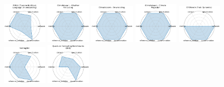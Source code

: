 
\begin{figure}[ht!]
\centering
\includegraphics[width=0.1900\textwidth]{images/mmlu_massive_multitask_language_understanding_radar.pdf}
\includegraphics[width=0.1900\textwidth]{images/climatelearn_-_weather_forcasting_radar.pdf}
\includegraphics[width=0.1900\textwidth]{images/climatelearn_-_downscaling_radar.pdf}
\includegraphics[width=0.1900\textwidth]{images/climatelearn_-_climate_projection_radar.pdf}
\includegraphics[width=0.1900\textwidth]{images/cfdbench_fluid_dynamics_radar.pdf}
\\[1ex]
\includegraphics[width=0.1900\textwidth]{images/satimgnet_radar.pdf}
\includegraphics[width=0.1900\textwidth]{images/quantum_computing_benchmarks_qml_radar.pdf}

\end{figure}
